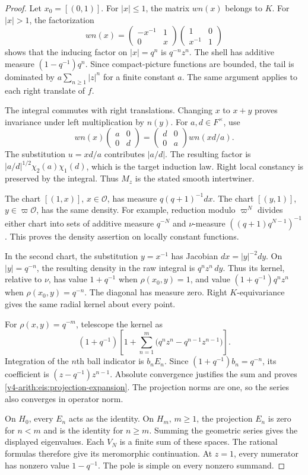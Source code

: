 \begin{proof}
Let $x_0=[(0,1)]$.
For $|x|\le1$, the matrix $wn(x)$ belongs to $K$.
For $|x|>1$, the factorization
\[
 wn(x)=
 \begin{pmatrix}-x^{-1}&1\\0&x\end{pmatrix}
 \begin{pmatrix}1&0\\x^{-1}&1\end{pmatrix}
\]
shows that the inducing factor on $|x|=q^n$ is $q^{-n}z^n$.
The shell has additive measure $(1-q^{-1})q^n$.
Since compact-picture functions are bounded, the tail is dominated by
$a\sum_{n\ge1}|z|^n$ for a finite constant $a$.
The same argument applies to each right translate of $f$.

The integral commutes with right translations.
Changing $x$ to $x+y$ proves invariance under left multiplication by $n(y)$.
For $a,d\in F^\times$, use
\[
 wn(x)\begin{pmatrix}a&0\\0&d\end{pmatrix}
 =\begin{pmatrix}d&0\\0&a\end{pmatrix}wn(xd/a).
\]
The substitution $u=xd/a$ contributes $|a/d|$.
The resulting factor is $|a/d|^{1/2}\chi_2(a)\chi_1(d)$,
which is the target induction law.
Right local constancy is preserved by the integral.
Thus $M_z$ is the stated smooth intertwiner.

The chart $[(1,x)]$, $x\in\mathcal O$, has measure
$q(q+1)^{-1}dx$.
The chart $[(y,1)]$, $y\in\varpi\mathcal O$, has the same density.
For example, reduction modulo $\varpi^N$ divides either chart into
sets of additive measure $q^{-N}$ and $\nu$-measure
$((q+1)q^{N-1})^{-1}$.
This proves the density assertion on locally constant functions.

In the second chart, the substitution $y=x^{-1}$ has Jacobian
$dx=|y|^{-2}dy$.
On $|y|=q^{-n}$, the resulting density in the raw integral is
$q^nz^n\,dy$.
Thus its kernel, relative to $\nu$, has value $1+q^{-1}$ when
$\rho(x_0,y)=1$, and value $(1+q^{-1})q^nz^n$ when
$\rho(x_0,y)=q^{-n}$.
The diagonal has measure zero.
Right $K$-equivariance gives the same radial kernel about every point.

For $\rho(x,y)=q^{-m}$, telescope the kernel as
\[
 (1+q^{-1})\left[
 1+\sum_{n=1}^{m}\bigl(q^nz^n-q^{n-1}z^{n-1}\bigr)\right].
\]
Integration of the $n$th ball indicator is $b_nE_n$.
Since $(1+q^{-1})b_n=q^{-n}$, its coefficient is
$(z-q^{-1})z^{n-1}$.
Absolute convergence justifies the sum and proves
\eqref{v4-arith:eis:projection-expansion}.
The projection norms are one, so the series also converges in operator norm.

On $H_0$, every $E_n$ acts as the identity.
On $H_m$, $m\ge1$, the projection $E_n$ is zero for $n<m$ and
is the identity for $n\ge m$.
Summing the geometric series gives the displayed eigenvalues.
Each $V_N$ is a finite sum of these spaces.
The rational formulas therefore give its meromorphic continuation.
At $z=1$, every numerator has nonzero value $1-q^{-1}$.
The pole is simple on every nonzero summand.
\end{proof}

